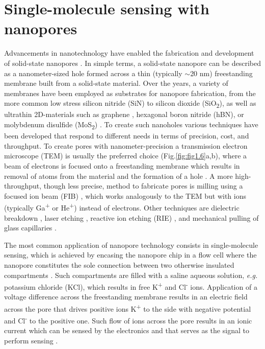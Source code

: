 \section[Single-molecule sensing with nanopores]{Single-molecule sensing with nanopores}
Advancements in nanotechnology have enabled the fabrication and development of solid-state nanopores \cite{Dekker2007,Xue2020}. In simple terms, a solid-state nanopore can be described as a nanometer-sized hole formed across a thin (typically $\sim$20 nm) freestanding membrane built from a solid-state material. Over the years, a variety of membranes have been employed as substrates for nanopore fabrication, from the more common low stress silicon nitride \cite{Balan2014,Venta2013}(SiN) to silicon dioxide (SiO\textsubscript{2}), as well as ultrathin 2D-materials such as graphene \cite{Merchant2010,Schneider2010}, hexagonal boron nitride (hBN)\cite{Zhou2013,Park2016}, or molybdenum disulfide (MoS\textsubscript{2}) \cite{Graf2019}. To create such nanoholes various techniques have been developed that respond to different needs in terms of precision, cost, and throughput. To create pores with nanometer-precision a transmission electron microscope (TEM) is usually the preferred choice (Fig.\ref{fig:fig1.6}a,b), where a beam of electrons is focused onto a freestanding membrane which results in removal of atoms from the material and the formation of a hole \cite{Storm2003}. A more high-throughput, though less precise, method to fabricate pores is milling using a focused ion beam (FIB) \cite{Lanyon2007,Schiedt2010}, which works analogously to the TEM but with ions (typically Ga\textsuperscript{+} or He\textsuperscript{+}) instead of electrons. Other techniques are dielectric breakdown \cite{Kwok2014,Pud2015}, laser etching \cite{Gilboa2019}, reactive ion etching (RIE) \cite{Verschueren2018}, and mechanical pulling of glass capillaries \cite{Piper2006}. 

The most common application of nanopore technology consists in single-molecule sensing, which is achieved by encasing the nanopore chip in a flow cell where the nanopo\-re constitutes the sole connection between two otherwise insulated compartments \cite{Maglia2010}. Such compartments are filled with a saline aqueous solution, \emph{e.g.} potassium chloride (KCl), which results in free K\textsuperscript{+} and Cl\textsuperscript{-} ions. Application of a voltage difference across the freestanding membrane results in an electric field across the pore that drives positive ions K\textsuperscript{+} to the side with negative potential and Cl\textsuperscript{-} to the positive one. Such flow of ions across the pore results in an ionic current which can be sensed by the electronics and that serves as the signal to perform sensing \cite{Howorka2009}. 

